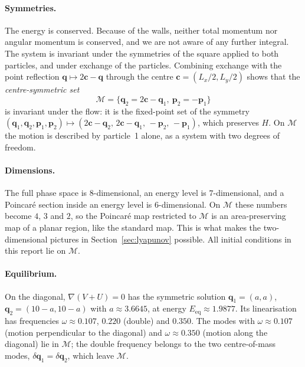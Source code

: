 \documentclass[11pt,a4paper]{article}
\newcommand{\q}{\mathbf{q}}
\newcommand{\p}{\mathbf{p}}
\newcommand{\M}{\mathcal{M}}
\begin{document}
\paragraph{Symmetries.}
The energy is conserved. Because of the walls, neither total momentum nor
angular momentum is conserved, and we are not aware of any further integral.
The system is invariant under the symmetries of the square applied to both
particles, and under exchange of the particles. Combining exchange with the
point reflection $\q\mapsto2\mathbf{c}-\q$ through the centre
$\mathbf{c}=(L_x/2,L_y/2)$ shows that the \emph{centre-symmetric set}
\begin{equation}\label{eq:centresym}
  \M=\bigl\{\q_2 = 2\mathbf{c}-\q_1,\ \p_2=-\p_1\bigr\}
\end{equation}
is invariant under the flow: it is the fixed-point set of the symmetry
$(\q_1,\q_2,\p_1,\p_2)\mapsto(2\mathbf{c}-\q_2,\,2\mathbf{c}-\q_1,\,-\p_2,\,-\p_1)$,
which preserves $H$. On $\M$ the motion is described by particle~1 alone, as a
system with two degrees of freedom.

\paragraph{Dimensions.}
The full phase space is $8$-dimensional, an energy level is $7$-dimensional,
and a Poincar\'e section inside an energy level is $6$-dimensional. On $\M$
these numbers become $4$, $3$ and $2$, so the Poincar\'e map restricted to $\M$
is an area-preserving map of a planar region, like the standard map. This is
what makes the two-dimensional pictures in Section~\ref{sec:lyapunov}
possible. All initial conditions in this report lie on $\M$.

\paragraph{Equilibrium.}
On the diagonal, $\nabla(V+U)=0$ has the symmetric solution
$\q_1=(a,a)$, $\q_2=(10-a,10-a)$ with $a\approx3.6645$, at energy
$E_{\mathrm{eq}}\approx1.9877$.
Its linearisation has frequencies $\omega\approx0.107$, $0.220$ (double) and
$0.350$.
The modes with $\omega\approx0.107$ (motion perpendicular to the
diagonal) and $\omega\approx0.350$ (motion along the diagonal) lie in $\M$;
the double frequency belongs to the two centre-of-mass modes,
$\delta\q_1=\delta\q_2$, which leave $\M$.
\end{document}
